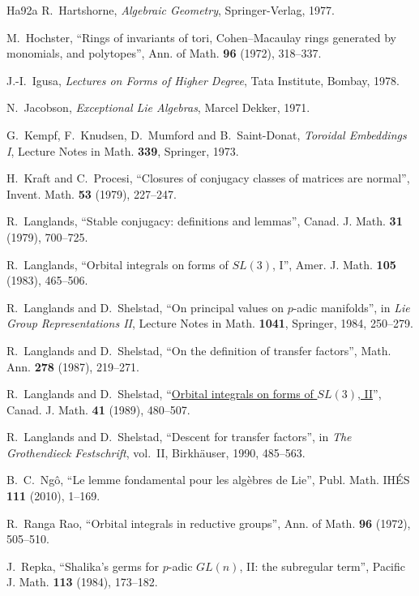 \documentclass[12pt,letterpaper]{amsart}
\theoremstyle{plain}
\theoremstyle{definition}
\theoremstyle{remark}
\theoremstyle{definition}
\begin{document}
\begin{thebibliography}{Ha92a}
 R.~Hartshorne, \textit{Algebraic Geometry},
Springer-Verlag, 1977.

 M.~Hochster, ``Rings of invariants of tori,
Cohen--Macaulay rings generated by monomials, and polytopes'', Ann. of Math.
\textbf{96} (1972), 318--337.

 J.-I.~Igusa, \textit{Lectures on Forms of Higher
Degree}, Tata Institute, Bombay, 1978.

 N.~Jacobson, \textit{Exceptional Lie Algebras}, Marcel
Dekker, 1971.

 G.~Kempf, F.~Knudsen, D.~Mumford and B.~Saint-Donat,
\textit{Toroidal Embeddings I}, Lecture Notes in Math. \textbf{339},
Springer, 1973.

 H.~Kraft and C.~Procesi, ``Closures of conjugacy classes
of matrices are normal'', Invent. Math. \textbf{53} (1979), 227--247.

 R.~Langlands, ``Stable conjugacy: definitions and
lemmas'', Canad. J. Math. \textbf{31} (1979), 700--725.

 R.~Langlands, ``Orbital integrals on forms of $SL(3)$,
I'', Amer. J. Math. \textbf{105} (1983), 465--506.

 R.~Langlands and D.~Shelstad, ``On principal values on
$p$-adic manifolds'', in \textit{Lie Group Representations II}, Lecture Notes
in Math. \textbf{1041}, Springer, 1984, 250--279.

 R.~Langlands and D.~Shelstad, ``On the definition of
transfer factors'', Math. Ann. \textbf{278} (1987), 219--271.

 R.~Langlands and D.~Shelstad, ``\href{https://publications.ias.edu/sites/default/files/orbital-integrals-ii_rpl.pdf}{Orbital integrals on
forms of $SL(3)$, II}'', Canad. J. Math. \textbf{41} (1989), 480--507.

 R.~Langlands and D.~Shelstad, ``Descent for transfer
factors'', in \textit{The Grothendieck Festschrift}, vol.~II, Birkh\"auser,
1990, 485--563.

 B.~C.~Ng\^o, ``Le lemme fondamental pour les
alg\`ebres de Lie'', Publ. Math. IH\'ES \textbf{111} (2010), 1--169.

 R.~Ranga Rao, ``Orbital integrals in reductive
groups'', Ann. of Math. \textbf{96} (1972), 505--510.

 J.~Repka, ``Shalika's germs for $p$-adic $GL(n)$, II:
the subregular term'', Pacific J. Math. \textbf{113} (1984), 173--182.


\end{thebibliography}
\end{document}
